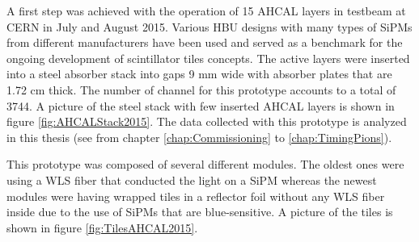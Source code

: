 A first step was achieved with the operation of 15 AHCAL layers in testbeam at CERN in July and August 2015. Various HBU designs with many types of SiPMs from different manufacturers have been used and served as a benchmark for the ongoing development of scintillator tiles concepts. The active layers were inserted into a steel absorber stack into gaps 9 mm wide with absorber plates that are 1.72 cm thick. The number of channel for this prototype accounts to a total of 3744. A picture of the steel stack with few inserted AHCAL layers is shown in figure \ref{fig:AHCALStack2015}. The data collected with this prototype is analyzed in this thesis (see from chapter \ref{chap:Commissioning} to \ref{chap:TimingPions}).

This prototype was composed of several different modules. The oldest ones were using a WLS fiber that conducted the light on a SiPM whereas the newest modules were having wrapped tiles in a reflector foil without any WLS fiber inside due to the use of SiPMs that are blue-sensitive. A picture of the tiles is shown in figure \ref{fig:TilesAHCAL2015}.

